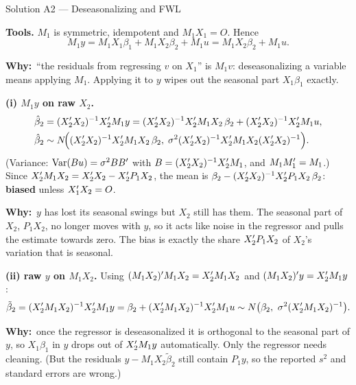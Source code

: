 \documentclass[11pt]{article}
\newcommand{\step}[1]{\par\smallskip\noindent\textbf{\textcolor{qnavy}{#1}}\quad\ignorespaces}
\newcommand{\Why}{\textbf{\textcolor{whyline}{Why:}}\ }
\begin{document}
\begin{solbox}{Solution A2 --- Deseasonalizing and FWL}
\step{Tools.} $M_{1}$ is symmetric, idempotent and $M_{1}X_{1} = O$. Hence
\[
  M_{1}y = M_{1}X_{1}\beta_{1} + M_{1}X_{2}\beta_{2} + M_{1}u = M_{1}X_{2}\beta_{2} + M_{1}u .
\]
\begin{why}\Why ``the residuals from regressing $v$ on $X_{1}$'' is $M_{1}v$:
deseasonalizing a variable means applying $M_{1}$. Applying it to $y$ wipes out the
seasonal part $X_{1}\beta_{1}$ exactly.\end{why}

\step{(i) $M_{1}y$ on raw $X_{2}$.}
\begin{align*}
  \hat\beta_{2} &= (X_{2}^{\prime} X_{2})^{-1}X_{2}^{\prime} M_{1}y
   = (X_{2}^{\prime} X_{2})^{-1}X_{2}^{\prime} M_{1}X_{2}\,\beta_{2} + (X_{2}^{\prime} X_{2})^{-1}X_{2}^{\prime} M_{1}u,\\
  \hat\beta_{2} &\sim N\!\Big((X_{2}^{\prime} X_{2})^{-1}X_{2}^{\prime} M_{1}X_{2}\,\beta_{2},\;
   \sigma^{2}(X_{2}^{\prime} X_{2})^{-1}X_{2}^{\prime} M_{1}X_{2}(X_{2}^{\prime} X_{2})^{-1}\Big).
\end{align*}
(Variance: $\operatorname{Var}(Bu) = \sigma^{2}BB^{\prime}$ with $B = (X_{2}^{\prime} X_{2})^{-1}X_{2}^{\prime} M_{1}$, and $M_{1}M_{1}^{\prime} = M_{1}$.)
Since $X_{2}^{\prime} M_{1}X_{2} = X_{2}^{\prime} X_{2} - X_{2}^{\prime} P_{1}X_{2}$, the mean is
$\beta_{2} - (X_{2}^{\prime} X_{2})^{-1}X_{2}^{\prime} P_{1}X_{2}\,\beta_{2}$: \textbf{biased} unless $X_{1}^{\prime} X_{2} = O$.
\begin{why}\Why $y$ has lost its seasonal swings but $X_{2}$ still has them. The seasonal
part of $X_{2}$, $P_{1}X_{2}$, no longer moves with $y$, so it acts like noise in the
regressor and pulls the estimate towards zero. The bias is exactly the share
$X_{2}^{\prime} P_{1}X_{2}$ of $X_{2}$'s variation that is seasonal.\end{why}

\step{(ii) raw $y$ on $M_{1}X_{2}$.} Using $(M_{1}X_{2})^{\prime} M_{1}X_{2} = X_{2}^{\prime} M_{1}X_{2}$
and $(M_{1}X_{2})^{\prime} y = X_{2}^{\prime} M_{1}y$:
\[
  \tilde\beta_{2} = (X_{2}^{\prime} M_{1}X_{2})^{-1}X_{2}^{\prime} M_{1}y
  = \beta_{2} + (X_{2}^{\prime} M_{1}X_{2})^{-1}X_{2}^{\prime} M_{1}u
  \sim N\big(\beta_{2},\ \sigma^{2}(X_{2}^{\prime} M_{1}X_{2})^{-1}\big).
\]
\begin{why}\Why once the regressor is deseasonalized it is orthogonal to the seasonal
part of $y$, so $X_{1}\beta_{1}$ in $y$ drops out of $X_{2}^{\prime} M_{1}y$ automatically. Only
the regressor needs cleaning. (But the residuals $y - M_{1}X_{2}\tilde\beta_{2}$ still
contain $P_{1}y$, so the reported $s^{2}$ and standard errors are wrong.)\end{why}


\end{solbox}
\end{document}
